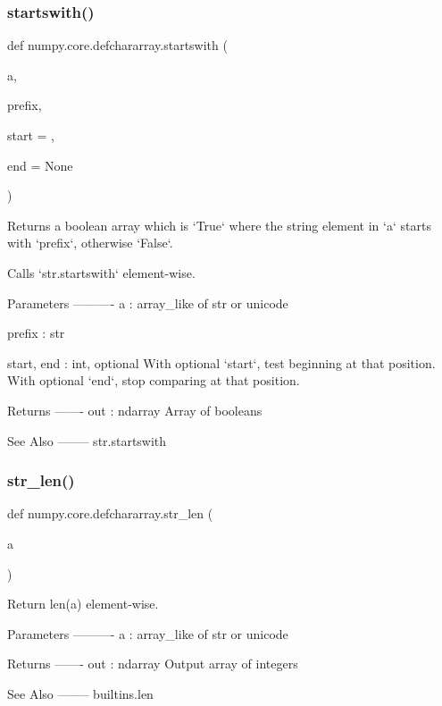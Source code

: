 \subsubsection{\texorpdfstring{startswith()}{startswith()}}
{\footnotesize\ttfamily def numpy.\+core.\+defchararray.\+startswith (\begin{DoxyParamCaption}\item[{}]{a,  }\item[{}]{prefix,  }\item[{}]{start = {},  }\item[{}]{end = {\ttfamily None} }\end{DoxyParamCaption})}

\begin{DoxyVerb}Returns a boolean array which is `True` where the string element
in `a` starts with `prefix`, otherwise `False`.

Calls `str.startswith` element-wise.

Parameters
----------
a : array_like of str or unicode

prefix : str

start, end : int, optional
    With optional `start`, test beginning at that position. With
    optional `end`, stop comparing at that position.

Returns
-------
out : ndarray
    Array of booleans

See Also
--------
str.startswith\end{DoxyVerb}
 \mbox{\label{namespacenumpy_1_1core_1_1defchararray_a74673e10d6bebdbe3b62f7fa7fa4027c}} 
\subsubsection{\texorpdfstring{str\+\_\+len()}{str\_len()}}
{\footnotesize\ttfamily def numpy.\+core.\+defchararray.\+str\+\_\+len (\begin{DoxyParamCaption}\item[{}]{a }\end{DoxyParamCaption})}

\begin{DoxyVerb}Return len(a) element-wise.

Parameters
----------
a : array_like of str or unicode

Returns
-------
out : ndarray
    Output array of integers

See Also
--------
builtins.len
\end{DoxyVerb}
 \mbox{\label{namespacenumpy_1_1core_1_1defchararray_a1b994662128d82614276bf46e2b1b2a8}} 
